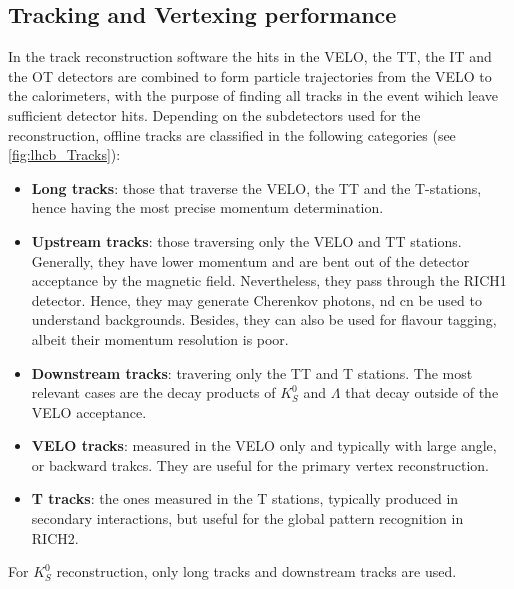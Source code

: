 
\subsection{Tracking and Vertexing performance}
\label{sec:TrackingPerformance}
In the track reconstruction software the hits in the VELO, the TT, the IT and the OT detectors are combined to form particle trajectories from the VELO to the calorimeters, with the purpose of finding all tracks in the event wihich leave sufficient detector hits. Depending on the subdetectors used for the reconstruction, offline tracks are classified in the following categories (see \ref{fig:lhcb_Tracks}): 

\begin{itemize}
\item \textbf{Long tracks}: those that traverse the VELO, the TT and the T-stations, hence having the most precise momentum determination. 
\item \textbf{Upstream tracks}: those traversing only the VELO and TT stations. Generally, they have lower momentum and are bent out of the detector acceptance by the magnetic field. Nevertheless, they pass through the RICH1 detector. Hence, they may generate Cherenkov photons, nd cn be used to understand backgrounds. Besides, they can also be used for flavour tagging, albeit their momentum resolution is poor.
\item \textbf{Downstream tracks}: travering only the TT and T stations. The most relevant cases are the decay products of $K_S^0$ and $\Lambda$ that decay outside of the VELO acceptance. 
\item \textbf{VELO tracks}: measured in the VELO only and typically with large angle, or backward trakcs. They are useful for the primary vertex reconstruction. 
\item \textbf{T tracks}: the ones measured in the T stations, typically produced in secondary interactions, but useful for the global pattern recognition in RICH2. 
\end{itemize}
For $K_S^0$ reconstruction, only long tracks and downstream tracks are used. 


